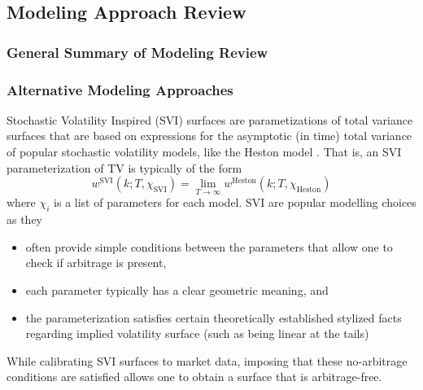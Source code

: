 \documentclass[11pt,letterpaper]{article}
\begin{document}
\subsection{Modeling Approach Review}
\subsubsection{General Summary of Modeling Review} \label{sec:model-summary}
\subsubsection{Alternative Modeling Approaches}

Stochastic Volatility Inspired (SVI) surfaces are parametizations of total variance surfaces that are based on expressions for the asymptotic (in time) total variance of popular stochastic volatility models, like the Heston model \cite{heston1994closed}. That is, an SVI parameterization of TV is typically of the form
\[
w^{\text{SVI}}(k;T, \chi_{\text{SVI}} ) = \lim_{T\to\infty} w^{\text{Heston}}(k;T,\chi_{\text{Heston}} )
\]
where $\chi_{i}$ is a list of parameters for each model. SVI are popular modelling choices as they
\begin{itemize}
\item often provide simple conditions between the parameters that allow one to check if arbitrage is present, 
\item each parameter typically has a clear geometric meaning, and
\item the parameterization satisfies certain theoretically established stylized facts regarding implied volatility surface (such as being linear at the tails)
\end{itemize}
While calibrating SVI surfaces to market data, imposing that these no-arbitrage conditions are satisfied allows one to obtain a surface that is arbitrage-free. 
\end{document}
